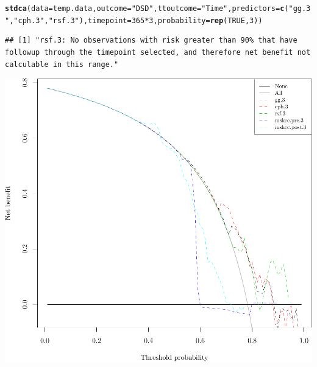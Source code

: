 \documentclass{article}\usepackage[]{graphicx}\usepackage[]{color}
\makeatletter
\def\maxwidth{ %
  \ifdim\Gin@nat@width>\linewidth
    \linewidth
  \else
    \Gin@nat@width
  \fi
}
\newcommand{\hlnum}[1]{\textcolor[rgb]{0.686,0.059,0.569}{#1}}%
\newcommand{\hlstr}[1]{\textcolor[rgb]{0.192,0.494,0.8}{#1}}%
\newcommand{\hlopt}[1]{\textcolor[rgb]{0,0,0}{#1}}%
\newcommand{\hlstd}[1]{\textcolor[rgb]{0.345,0.345,0.345}{#1}}%
\newcommand{\hlkwc}[1]{\textcolor[rgb]{0.333,0.667,0.333}{#1}}%
\newcommand{\hlkwd}[1]{\textcolor[rgb]{0.737,0.353,0.396}{\textbf{#1}}}%
\newenvironment{kframe}{%
 \def\at@end@of@kframe{}%
 \ifinner\ifhmode%
  \def\at@end@of@kframe{\end{minipage}}%
  \begin{minipage}{\columnwidth}%
 \fi\fi%
 \def\FrameCommand##1{\hskip\@totalleftmargin \hskip-\fboxsep
 \colorbox{shadecolor}{##1}\hskip-\fboxsep
     \hskip-\linewidth \hskip-\@totalleftmargin \hskip\columnwidth}%
 \MakeFramed {\advance\hsize-\width
   \@totalleftmargin\z@ \linewidth\hsize
   \@setminipage}}%
 {\par\unskip\endMakeFramed%
 \at@end@of@kframe}
\newenvironment{knitrout}{}{} %
\makeatother
\begin{document}
\begin{knitrout}
\begin{kframe}
\begin{alltt}
\hlkwd{stdca}\hlstd{(}\hlkwc{data} \hlstd{= temp.data,} \hlkwc{outcome} \hlstd{=} \hlstr{"DSD"}\hlstd{,} \hlkwc{ttoutcome} \hlstd{=} \hlstr{"Time"}\hlstd{,} \hlkwc{predictors} \hlstd{=} \hlkwd{c}\hlstd{(}\hlstr{"gg.3"}\hlstd{,} \hlstr{"cph.3"}\hlstd{,} \hlstr{"rsf.3"}\hlstd{),} \hlkwc{timepoint} \hlstd{=} \hlnum{365}\hlopt{*}\hlnum{3}\hlstd{,} \hlkwc{probability} \hlstd{=} \hlkwd{rep}\hlstd{(}\hlnum{TRUE}\hlstd{,} \hlnum{3}\hlstd{))}
\end{alltt}
\begin{verbatim}
## [1] "rsf.3: No observations with risk greater than 90% that have followup through the timepoint selected, and therefore net benefit not calculable in this range."
\end{verbatim}
\end{kframe}

{\centering \includegraphics[width=\maxwidth]{figure/05-model-selection-dca-3} 

}



\end{knitrout}
\end{document}
